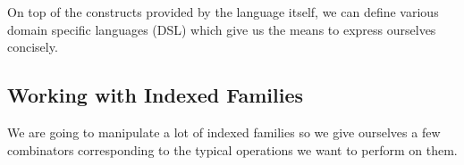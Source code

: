 On top of the constructs provided by the language itself, we can define various
domain specific languages (DSL) which give us the means to express ourselves
concisely.

\subsection{Working with Indexed Families}
\label{indexed-combinators}

We are going to manipulate a lot of indexed families so we give ourselves a few
combinators corresponding to the typical operations we want to perform on them.

